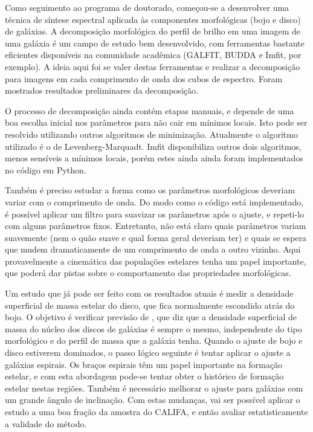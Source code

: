 Como seguimento ao programa de doutorado, começou-se a desenvolver uma técnica
de síntese espectral aplicada às componentes morfológicas (bojo e disco) de
galáxias. A decomposição morfológica do perfil de brilho em uma imagem de uma
galáxia é um campo de estudo bem desenvolvido, com ferramentas bastante
eficientes disponíveis na comunidade acadêmica (GALFIT, BUDDA e Imfit, por
exemplo). A ideia aqui foi se valer destas ferramentas e realizar a decomposição
para imagens em cada comprimento de onda dos cubos de espectro. Foram mostrados
resultados preliminares da decomposição.

O processo de decomposição ainda contém etapas manuais, e depende de uma boa
escolha inicial nos parâmetros para não cair em mínimos locais. Isto pode ser
resolvido utilizando outros algoritmos de minimização. Atualmente o algoritmo
utilizado é o de Levenberg-Marquadt. Imfit disponibiliza outros dois algoritmos,
menos sensíveis a mínimos locais, porém estes ainda ainda foram implementados no
código em Python.

Também é preciso estudar a forma como os parâmetros morfológicos deveriam variar
com o comprimento de onda. Do modo como o código está implementado, é possível
aplicar um filtro para suavizar os parâmetros após o ajuste, e repeti-lo com
alguns parâmetros fixos. Entretanto, não está claro quais parâmetros variam
suavemente (nem o quão suave e qual forma geral deveriam ter) e quais se espera
que mudem dramaticamente de um comprimento de onda a outro vizinho. Aqui
provavelmente a cinemática das populações estelares tenha um papel importante,
que poderá dar pistas sobre o comportamento das propriedades morfológicas.

Um estudo que já pode ser feito com os resultados atuais é medir a densidade
superficial de massa estelar do disco, que fica normalmente escondido atrás do
bojo. O objetivo é verificar previsão de \citet{Freeman1970}, que diz que a
densidade superficial de massa do núcleo dos discos de galáxias é sempre o
mesmo, independente do tipo morfológico e do perfil de massa que a galáxia
tenha. Quando o ajuste de bojo e disco estiverem dominados, o passo lógico
seguinte é tentar aplicar o ajuste a galáxias espirais. Os braços espirais têm
um papel importante na formação estelar, e com esta abordagem pode-se tentar
obter o histórico de formação estelar nestas regiões. Também é necessário
melhorar o ajuste para galáxias com um grande ângulo de inclinação. Com estas
mudanças, vai ser possível aplicar o estudo a uma boa fração da amostra do
CALIFA, e então avaliar estatisticamente a validade do método.


